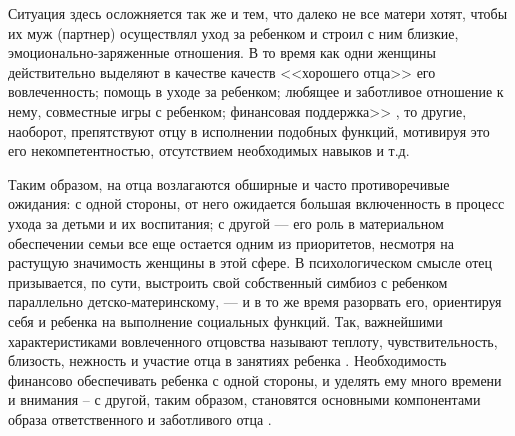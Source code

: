 \documentclass{../../common/thesisbyxetex}
\begin{document}
Ситуация здесь осложняется так же и тем, что далеко не все матери хотят, чтобы их муж (партнер)
осуществлял уход за ребенком и строил с ним близкие, эмоционально-заряженные отношения. В то время
как одни женщины действительно выделяют в качестве качеств <<хорошего отца>>  его вовлеченность;
помощь в уходе за ребенком; любящее и
заботливое отношение к нему, совместные игры с ребенком; финансовая поддержка>> \cite[137]{money},
то другие, наоборот, препятствуют отцу в исполнении подобных функций, мотивируя это его
некомпетентностью, отсутствием необходимых навыков и т.д.


Таким образом, на отца возлагаются обширные и часто противоречивые ожидания: с одной стороны, от
него ожидается большая включенность в процесс ухода за детьми и их воспитания; с другой --- его
роль в материальном обеспечении семьи все еще остается одним из приоритетов, несмотря на растущую
значимость женщины в этой сфере. В психологическом смысле отец призывается, по сути, выстроить свой
собственный симбиоз с ребенком параллельно детско-материнскому, --- и в то же время разорвать его,
ориентируя себя и ребенка на выполнение социальных функций. Так, важнейшими характеристиками
вовлеченного отцовства называют теплоту, чувствительность, близость, нежность и участие отца в
занятиях ребенка \cite[129]{f21}.
Необходимость финансово обеспечивать ребенка с одной стороны, и уделять ему много времени и
внимания -- с другой, таким образом, становятся основными компонентами образа ответственного и
заботливого отца \cite[129]{f21}.
\end{document}
